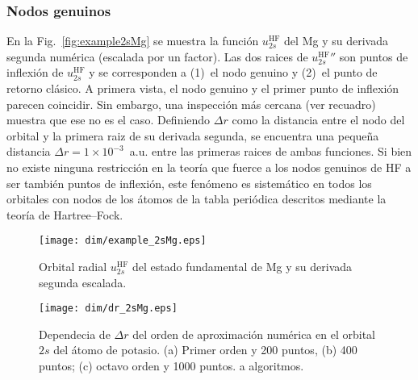 \subsubsection{Nodos genuinos}

En la Fig.~\ref{fig:example2sMg} se muestra la función 
$u_{2s}^{\mathrm{HF}}$ del Mg y su derivada segunda numérica (escalada 
por un factor). Las dos raices de $u_{2s}^{\mathrm{HF}}''$ son puntos de 
inflexión de $u_{2s}^{\mathrm{HF}}$ y se corresponden a (1)~el nodo 
genuino y (2)~el punto de retorno clásico. A primera vista, el nodo 
genuino y el primer punto de inflexión parecen coincidir. Sin embargo, 
una inspección más cercana (ver recuadro) muestra que ese no es el caso. 
Definiendo $\Delta r$ como la distancia entre el nodo del orbital y la 
primera raiz de su derivada segunda, se encuentra una pequeña distancia 
$\Delta r=1\times 10^{-3}$~a.u. entre las primeras raices de ambas 
funciones. Si bien no existe ninguna restricción en la teoría que fuerce 
a los nodos genuinos de HF a ser también puntos de inflexión, este 
fenómeno es sistemático en todos los orbitales con nodos de los átomos 
de la tabla periódica descritos mediante la teoría de Hartree--Fock. 

\begin{figure}
\vspace{-0.4cm}
\centering
\texttt{[image: dim/example\_2sMg.eps]} 
\vspace{-0.45cm}
\caption[Orbital radial y su derivada segunda.]
{Orbital radial $u_{2s}^{\mathrm{HF}}$ del estado fundamental de Mg y su 
derivada segunda escalada.}
\label{fig:example2sMg}

\vspace{0.4cm}
\texttt{[image: dim/dr\_2sMg.eps]} 
\vspace{-0.45cm}
\caption[Dependecia de $\Delta r$ del orden de aproximación numérica.]
{Dependecia de $\Delta r$ del orden de aproximación numérica en el 
orbital $2s$ del átomo de potasio. (a) Primer orden y 200 puntos, (b) 
400 puntos; (c) octavo orden y 1000 puntos.
a algoritmos.}
\label{fig:dr2sMg}
\end{figure}

